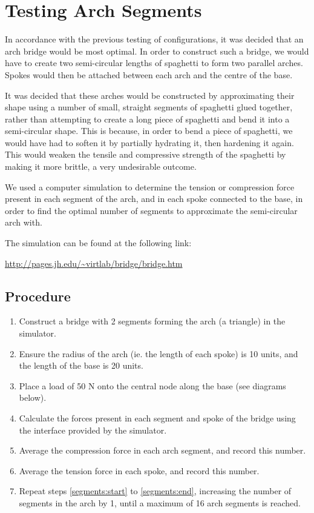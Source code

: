 \documentclass[a4paper,11pt]{article}
\begin{document}
\section{Testing Arch Segments}

In accordance with the previous testing of configurations, it was decided that
an arch bridge would be most optimal.
In order to construct such a bridge, we would have to create two semi-circular
lengths of spaghetti to form two parallel arches. Spokes would then be attached
between each arch and the centre of the base.

It was decided that these arches would be constructed by approximating their
shape using a number of small, straight segments of spaghetti glued together,
rather than attempting to create a long piece of spaghetti and bend it into a
semi-circular shape.
This is because, in order to bend a piece of spaghetti, we would have had to
soften it by partially hydrating it, then hardening it again.
This would weaken the tensile and compressive strength of the spaghetti by
making it more brittle, a very undesirable outcome.

We used a computer simulation to determine the tension or compression force
present in each segment of the arch, and in each spoke connected to the base,
in order to find the optimal number of segments to approximate the
semi-circular arch with.

The simulation can be found at the following link:

\begin{center}
\url{http://pages.jh.edu/~virtlab/bridge/bridge.htm}
\end{center}


\subsection{Procedure}

\begin{enumerate}
\item \label{segments:start} Construct a bridge with 2 segments forming the
	arch (a triangle) in the simulator.
\item Ensure the radius of the arch (ie. the length of each spoke) is 10 units,
	and the length of the base is 20 units.
\item Place a load of 50 N onto the central node along the base (see diagrams
	below).
\item Calculate the forces present in each segment and spoke of the bridge
	using the interface provided by the simulator.
\item Average the compression force in each arch segment, and record this
	number.
\item \label{segments:end} Average the tension force in each spoke, and record
	this number.
\item Repeat steps \ref{segments:start} to \ref{segments:end}, increasing the
	number of segments in the arch by 1, until a maximum of 16 arch segments is
	reached.
\end{enumerate}
\end{document}
